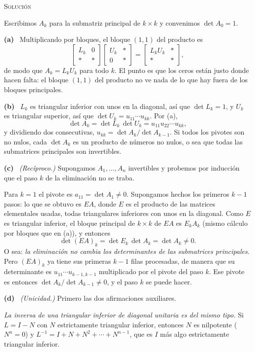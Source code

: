 \documentclass[11pt,a4paper]{article}
\newcommand{\solucion}{\par\medskip\noindent\textsc{Solución}\par\nobreak\smallskip\noindent}
\newcommand{\itemsol}[1]{\par\medskip\noindent\textbf{(#1)}\ \ignorespaces}
\begin{document}
\solucion
Escribimos $A_k$ para la submatriz principal de $k\times k$ y convenimos
$\det A_0=1$.

\itemsol{a} Multiplicando por bloques, el bloque $(1,1)$ del producto es
\[
\begin{bmatrix} L_k & 0\\ \ast & \ast\end{bmatrix}
\begin{bmatrix} U_k & \ast\\ 0 & \ast\end{bmatrix}
=\begin{bmatrix} L_kU_k & \ast\\ \ast & \ast\end{bmatrix},
\]
de modo que $A_k=L_kU_k$ para todo $k$. El punto es que los ceros están justo
donde hacen falta: el bloque $(1,1)$ del producto no ve nada de lo que hay fuera
de los bloques principales.

\itemsol{b} $L_k$ es triangular inferior con unos en la diagonal, así que
$\det L_k=1$, y $U_k$ es triangular superior, así que
$\det U_k=u_{11}\cdots u_{kk}$. Por (a),
\[
\det A_k=\det L_k\,\det U_k=u_{11}u_{22}\cdots u_{kk},
\]
y dividiendo dos consecutivas, $u_{kk}=\det A_k/\det A_{k-1}$. Si todos los
pivotes son no nulos, cada $\det A_k$ es un producto de números no nulos, o sea
que todas las submatrices principales son invertibles.

\itemsol{c} \emph{(Recíproco.)} Supongamos $A_1,\dots,A_n$ invertibles y
probemos por inducción que el paso $k$ de la eliminación no se traba.

Para $k=1$ el pivote es $a_{11}=\det A_1\neq0$. Supongamos hechos los primeros
$k-1$ pasos: lo que se obtuvo es $EA$, donde $E$ es el producto de las matrices
elementales usadas, todas triangulares inferiores con unos en la diagonal. Como
$E$ es triangular inferior, el bloque principal de $k\times k$ de $EA$ es
$E_kA_k$ (mismo cálculo por bloques que en (a)), y entonces
\[
\det (EA)_k=\det E_k\,\det A_k=\det A_k\neq0 .
\]
O sea: \emph{la eliminación no cambia los determinantes de las submatrices
principales}. Pero $(EA)_k$ ya tiene sus primeras $k-1$ filas procesadas, de
manera que su determinante es $u_{11}\cdots u_{k-1,k-1}$ multiplicado por el
pivote del paso $k$. Ese pivote es entonces $\det A_k/\det A_{k-1}\neq0$, y el
paso $k$ se puede hacer.

\itemsol{d} \emph{(Unicidad.)} Primero las dos afirmaciones auxiliares.

\emph{La inversa de una triangular inferior de diagonal unitaria es del mismo
tipo.} Si $L=I-N$ con $N$ estrictamente triangular inferior, entonces $N$ es
nilpotente ($N^n=0$) y $L^{-1}=I+N+N^2+\cdots+N^{n-1}$, que es $I$ más algo
estrictamente triangular inferior.
\end{document}
